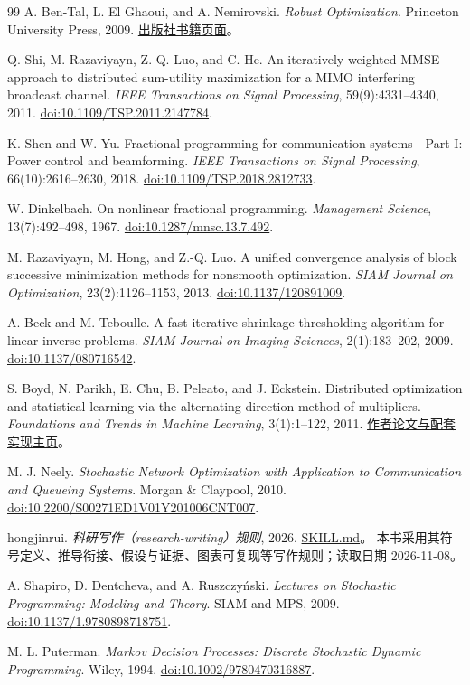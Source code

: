 \begin{thebibliography}{99}
A. Ben-Tal, L. El Ghaoui, and A. Nemirovski.
\emph{Robust Optimization}.
Princeton University Press, 2009.
\href{https://press.princeton.edu/books/ebook/9781400831050/robust-optimization-pdf}{出版社书籍页面}。

Q. Shi, M. Razaviyayn, Z.-Q. Luo, and C. He.
An iteratively weighted MMSE approach to distributed sum-utility maximization for a MIMO interfering broadcast channel.
\emph{IEEE Transactions on Signal Processing}, 59(9):4331--4340, 2011.
\href{https://doi.org/10.1109/TSP.2011.2147784}{doi:10.1109/TSP.2011.2147784}.

K. Shen and W. Yu.
Fractional programming for communication systems---Part I: Power control and beamforming.
\emph{IEEE Transactions on Signal Processing}, 66(10):2616--2630, 2018.
\href{https://doi.org/10.1109/TSP.2018.2812733}{doi:10.1109/TSP.2018.2812733}.

W. Dinkelbach.
On nonlinear fractional programming.
\emph{Management Science}, 13(7):492--498, 1967.
\href{https://doi.org/10.1287/mnsc.13.7.492}{doi:10.1287/mnsc.13.7.492}.

M. Razaviyayn, M. Hong, and Z.-Q. Luo.
A unified convergence analysis of block successive minimization methods for nonsmooth optimization.
\emph{SIAM Journal on Optimization}, 23(2):1126--1153, 2013.
\href{https://doi.org/10.1137/120891009}{doi:10.1137/120891009}.

A. Beck and M. Teboulle.
A fast iterative shrinkage-thresholding algorithm for linear inverse problems.
\emph{SIAM Journal on Imaging Sciences}, 2(1):183--202, 2009.
\href{https://doi.org/10.1137/080716542}{doi:10.1137/080716542}.

S. Boyd, N. Parikh, E. Chu, B. Peleato, and J. Eckstein.
Distributed optimization and statistical learning via the alternating direction method of multipliers.
\emph{Foundations and Trends in Machine Learning}, 3(1):1--122, 2011.
\href{https://web.stanford.edu/~boyd/papers/admm_distr_stats.html}{作者论文与配套实现主页}。

M. J. Neely.
\emph{Stochastic Network Optimization with Application to Communication and Queueing Systems}.
Morgan \& Claypool, 2010.
\href{https://doi.org/10.2200/S00271ED1V01Y201006CNT007}{doi:10.2200/S00271ED1V01Y201006CNT007}.

hongjinrui.
\emph{科研写作（research-writing）规则}, 2026.
\href{https://github.com/hongjinrui/writing_skills/blob/main/SKILL.md}{SKILL.md}。
本书采用其符号定义、推导衔接、假设与证据、图表可复现等写作规则；读取日期 2026-11-08。

A. Shapiro, D. Dentcheva, and A. Ruszczy\'nski.
\emph{Lectures on Stochastic Programming: Modeling and Theory}.
SIAM and MPS, 2009.
\href{https://doi.org/10.1137/1.9780898718751}{doi:10.1137/1.9780898718751}.

M. L. Puterman.
\emph{Markov Decision Processes: Discrete Stochastic Dynamic Programming}.
Wiley, 1994.
\href{https://doi.org/10.1002/9780470316887}{doi:10.1002/9780470316887}.
\end{thebibliography}
